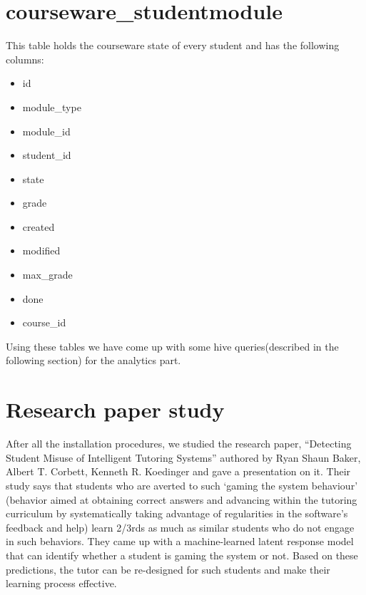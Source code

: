 \documentclass[a4paper,12pt,oneside]{sphinxmanual}
\begin{document}
\section{courseware\_studentmodule}
\label{document:courseware-studentmodule}
This table holds the courseware state of every student and has the following columns:
\begin{itemize}
\item {} 
id

\item {} 
module\_type

\item {} 
module\_id

\item {} 
student\_id

\item {} 
state

\item {} 
grade

\item {} 
created

\item {} 
modified

\item {} 
max\_grade

\item {} 
done

\item {} 
course\_id

\end{itemize}

Using these tables we have come up with some hive queries(described in the following section) for the analytics part.


\section{Research paper study}
\label{document:research-paper-study}
After all the installation procedures, we studied the research paper, “Detecting Student Misuse of Intelligent Tutoring Systems” authored by Ryan Shaun Baker, Albert T. Corbett, Kenneth R. Koedinger and gave a presentation on it. Their study says that students who are averted to such ‘gaming the system behaviour’ (behavior aimed at obtaining correct answers and advancing within the tutoring curriculum by systematically taking advantage of regularities in the software’s feedback and help) learn 2/3rds as much as similar students who do not engage in such behaviors. They came up with a machine-learned latent response model that can identify whether a student is gaming the system or not. Based on these predictions, the tutor can be re-designed for such students and make their learning process effective.
\end{document}
